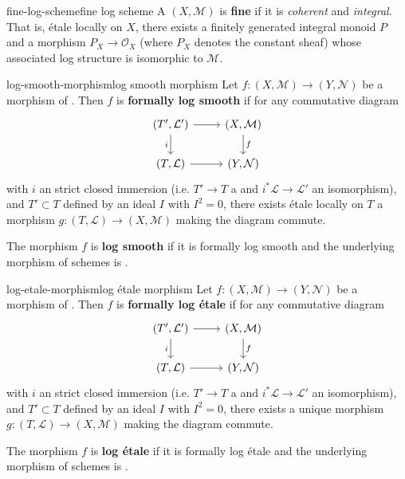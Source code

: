 \begin{topic}{fine-log-scheme}{fine log scheme}
    A  $(X, \mathcal{M})$ is \textbf{fine} if it is \textit{coherent} and \textit{integral}. That is, étale locally on $X$, there exists a finitely generated integral monoid $P$ and a morphism $P_X \to \mathcal{O}_X$ (where $P_X$ denotes the constant sheaf) whose associated log structure is isomorphic to $\mathcal{M}$.
\end{topic}

\begin{topic}{log-smooth-morphism}{log smooth morphism}
    Let $f \colon (X, \mathcal{M}) \to (Y, \mathcal{N})$ be a morphism of  . Then $f$ is \textbf{formally log smooth} if for any commutative diagram
    \[ \svg \begin{tikzcd} (T', \mathcal{L}') \arrow{r} \arrow[swap]{d}{i} & (X, \mathcal{M}) \arrow{d}{f} \\ (T, \mathcal{L}) \arrow{r} & (Y, \mathcal{N}) \end{tikzcd} \]
    with $i$ an strict closed immersion (i.e. $T' \to T$ a  and $i^* \mathcal{L} \to \mathcal{L}'$ an isomorphism), and $T' \subset T$ defined by an ideal $I$ with $I^2 = 0$, there exists étale locally on $T$ a morphism $g \colon (T, \mathcal{L}) \to (X, \mathcal{M})$ making the diagram commute.
    
    The morphism $f$ is \textbf{log smooth} if it is formally log smooth and the underlying morphism of schemes is .
\end{topic}

\begin{topic}{log-etale-morphism}{log étale morphism}
    Let $f \colon (X, \mathcal{M}) \to (Y, \mathcal{N})$ be a morphism of  . Then $f$ is \textbf{formally log étale} if for any commutative diagram
    \[ \svg \begin{tikzcd} (T', \mathcal{L}') \arrow{r} \arrow[swap]{d}{i} & (X, \mathcal{M}) \arrow{d}{f} \\ (T, \mathcal{L}) \arrow{r} & (Y, \mathcal{N}) \end{tikzcd} \]
    with $i$ an strict closed immersion (i.e. $T' \to T$ a  and $i^* \mathcal{L} \to \mathcal{L}'$ an isomorphism), and $T' \subset T$ defined by an ideal $I$ with $I^2 = 0$, there exists a unique morphism $g \colon (T, \mathcal{L}) \to (X, \mathcal{M})$ making the diagram commute.
    
    The morphism $f$ is \textbf{log étale} if it is formally log étale and the underlying morphism of schemes is .
\end{topic}

